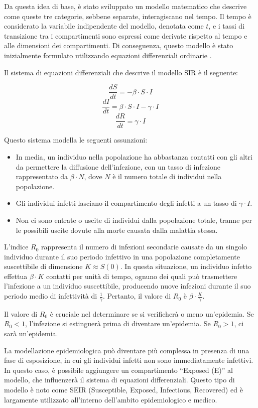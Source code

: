 Da questa idea di base, è stato sviluppato un modello matematico che 
descrive come queste tre categorie, sebbene separate, interagiscano 
nel tempo. Il tempo è considerato la variabile indipendente del modello, 
denotata come $t$, e i tassi di transizione tra i compartimenti sono 
espressi come derivate rispetto al tempo e alle dimensioni dei 
compartimenti. Di conseguenza, questo modello è stato inizialmente 
formulato utilizzando equazioni differenziali ordinarie \cite{Brauer2008}.

Il sistema di equazioni differenziali che descrive il modello SIR è il seguente:

\[ \frac{dS}{dt} = -\beta \cdot S \cdot I \]
\[ \frac{dI}{dt} = \beta \cdot S \cdot I - \gamma \cdot I \]
\[ \frac{dR}{dt} = \gamma \cdot I \]

Questo sistema modella le seguenti assunzioni:

\begin{itemize}
    \item In media, un individuo nella popolazione ha abbastanza contatti 
    con gli altri da permettere la diffusione dell'infezione, con un tasso 
    di infezione rappresentato da $\beta \cdot N$, dove $N$ è il numero 
    totale di individui nella popolazione.
    \item Gli individui infetti lasciano il compartimento degli infetti a 
    un tasso di $\gamma \cdot I$.
    \item Non ci sono entrate o uscite di individui dalla popolazione 
    totale, tranne per le possibili uscite dovute alla morte causata 
    dalla malattia stessa.
\end{itemize}

L'indice $R_0$ rappresenta il numero di infezioni secondarie causate da 
un singolo individuo durante il suo periodo infettivo in una popolazione 
completamente suscettibile di dimensione $K \approx S(0)$. In questa 
situazione, un individuo infetto effettua $\beta \cdot K$ contatti per 
unità di tempo, ognuno dei quali può trasmettere l'infezione a un 
individuo suscettibile, producendo nuove infezioni durante il suo periodo 
medio di infettività di $\frac{1}{\gamma}$. Pertanto, il valore 
di $R_0$ è $\beta \cdot \frac{K}{\gamma}$.

Il valore di $R_0$ è cruciale nel determinare se si verificherà o meno 
un'epidemia. Se $R_0 < 1$, l'infezione si estinguerà prima di diventare 
un'epidemia. Se $R_0 > 1$, ci sarà un'epidemia.

La modellazione epidemiologica può diventare più complessa in presenza 
di una fase di esposizione, in cui gli individui infetti non sono 
immediatamente infettivi. In questo caso, è possibile aggiungere un 
compartimento ``Exposed (E)'' al modello, che influenzerà il sistema di 
equazioni differenziali. Questo tipo di modello è noto come SEIR 
(Susceptible, Exposed, Infectious, Recovered) ed è largamente
utilizzato all'interno dell'ambito epidemiologico e medico.

